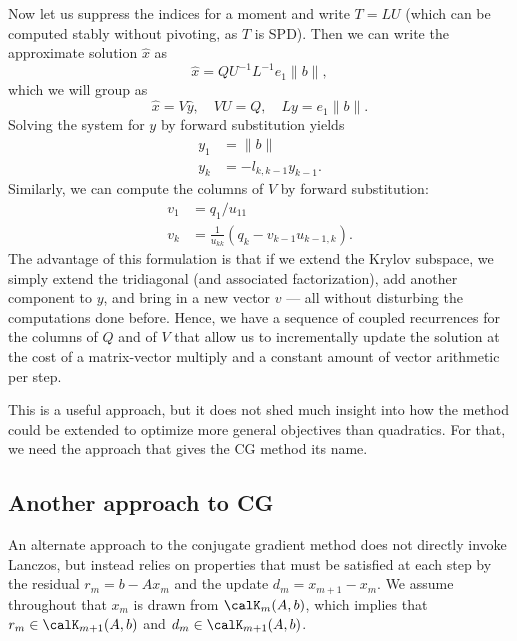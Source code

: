 \documentclass[12pt, leqno]{article} %
\begin{document}
Now let us suppress the indices for a moment and
write $T = LU$ (which can be computed stably without pivoting,
as $T$ is SPD).  Then we can write the approximate solution
$\hat{x}$ as
\[
  \hat{x} = Q U^{-1} L^{-1} e_1 \|b\|,
\]
which we will group as
\[
  \hat{x} = V \hat{y}, \quad VU = Q, \quad Ly = e_1 \|b\|.
\]
Solving the system for $y$ by forward substitution yields
\begin{align*}
  y_1 &= \|b\| \\
  y_k &= -l_{k,k-1} y_{k-1}.
\end{align*}
Similarly, we can compute the columns of $V$ by forward
substitution:
\begin{align*}
  v_1 &= q_1 / u_{11} \\
  v_k &= \frac{1}{u_{kk}} \left( q_k - v_{k-1} u_{k-1,k} \right).
\end{align*}
The advantage of this formulation is that if we extend the Krylov
subspace, we simply extend the tridiagonal (and associated
factorization), add another component to $y$, and bring in a new
vector $v$ --- all without disturbing the computations done before.
Hence, we have a sequence of coupled recurrences for the columns
of $Q$ and of $V$ that allow us to incrementally update the solution
at the cost of a matrix-vector multiply and a constant amount
of vector arithmetic per step.

This is a useful approach, but it does not shed much insight into how the
method could be extended to optimize more general objectives than
quadratics.  For that, we need the approach that gives the CG method its
name.

\subsection{Another approach to CG}

An alternate approach to the conjugate gradient method does not directly
invoke Lanczos, but instead relies on properties that must be satisfied
at each step by the residual $r_m = b-Ax_m$ and the update
$d_m = x_{m+1}-x_m$.  We assume throughout that $x_m$ is drawn from
$\calK_m(A,b)$, which implies that $r_m \in \calK_{m+1}(A,b)$ and
$d_m \in \calK_{m+1}(A,b)$.
\end{document}
